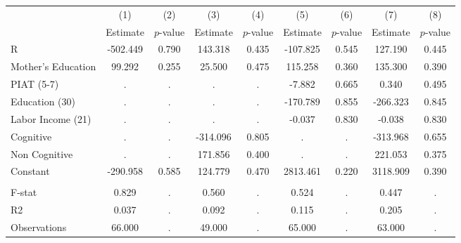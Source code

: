 \begin{tabular}{lcccccccc} \toprule
 & (1) & (2) & (3) & (4) & (5) & (6) & (7) & (8) \\ 
 & Estimate  & $p$-value  & Estimate  & $p$-value  & Estimate  & $p$-value  & Estimate  & $p$-value  \\  \midrule
R &  -502.449 &     0.790 &   143.318 &     0.435 &  -107.825 &     0.545 &   127.190 &     0.445 \\  
Mother's Education &    99.292 &     0.255 &    25.500 &     0.475 &   115.258 &     0.360 &   135.300 &     0.390 \\  
PIAT (5-7) &         . &         . &         . &         . &    -7.882 &     0.665 &     0.340 &     0.495 \\  
Education (30) &         . &         . &         . &         . &  -170.789 &     0.855 &  -266.323 &     0.845 \\  
Labor Income (21) &         . &         . &         . &         . &    -0.037 &     0.830 &    -0.038 &     0.830 \\  
Cognitive &         . &         . &  -314.096 &     0.805 &         . &         . &  -313.968 &     0.655 \\  
Non Cognitive &         . &         . &   171.856 &     0.400 &         . &         . &   221.053 &     0.375 \\  
Constant &  -290.958 &     0.585 &   124.779 &     0.470 &  2813.461 &     0.220 &  3118.909 &     0.390 \\ \\  \midrule
F-stat &     0.829 &         . &     0.560 &         . &     0.524 &         . &     0.447 &         . \\  
R2 &     0.037 &         . &     0.092 &         . &     0.115 &         . &     0.205 &         . \\  
Observations &    66.000 &         . &    49.000 &         . &    65.000 &         . &    63.000 &         . \\  
\bottomrule \end{tabular}

